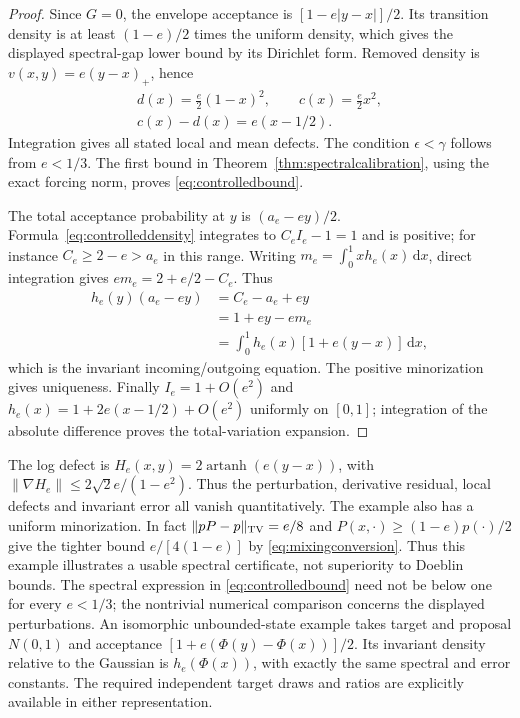 \documentclass[pdflatex,iicol,sn-mathphys-ay]{sn-jnl}
\theoremstyle{definition}\newtheorem{definition}[theorem]{Definition}
\theoremstyle{remark}\newtheorem{remark}[theorem]{Remark}
\numberwithin{equation}{section}
\newcommand{\dd}{\,\mathrm d}\newcommand{\cA}{c_\alpha}\newcommand{\sg}{\operatorname{sigmoid}}
\newcommand{\1}{\mathbf 1}
\begin{document}
\begin{proof}
Since $G=0$, the envelope acceptance is $[1-e|y-x|]/2$. Its transition density is at least $(1-e)/2$ times the uniform density, which gives the displayed spectral-gap lower bound by its Dirichlet form. Removed density is $v(x,y)=e(y-x)_+$, hence
\[
\begin{gathered}
 d(x)=\frac e2(1-x)^2,\qquad c(x)=\frac e2x^2,\\
 c(x)-d(x)=e(x-1/2).
\end{gathered}
\]
Integration gives all stated local and mean defects. The condition $\epsilon<\gamma$ follows from $e<1/3$. The first bound in Theorem~\ref{thm:spectralcalibration}, using the exact forcing norm, proves \eqref{eq:controlledbound}.

The total acceptance probability at $y$ is $(a_e-ey)/2$. Formula~\eqref{eq:controlleddensity} integrates to $C_e I_e-1=1$ and is positive; for instance $C_e\ge2-e>a_e$ in this range. Writing $m_e=\int_0^1 xh_e(x)\dd x$, direct integration gives $em_e=2+e/2-C_e$. Thus
\[
\begin{aligned}
 h_e(y)(a_e-ey)&=C_e-a_e+ey\\
 &=1+ey-em_e\\
 &=\int_0^1 h_e(x)[1+e(y-x)]\dd x,
\end{aligned}
\]
which is the invariant incoming/outgoing equation. The positive minorization gives uniqueness. Finally $I_e=1+O(e^2)$ and
$h_e(x)=1+2e(x-1/2)+O(e^2)$ uniformly on $[0,1]$; integration of the absolute difference proves the total-variation expansion.
\end{proof}

The log defect is $H_e(x,y)=2\operatorname{artanh}(e(y-x))$, with
$\|\nabla H_e\|\le2\sqrt2e/(1-e^2)$. Thus the perturbation, derivative residual, local defects and invariant error all vanish quantitatively. The example also has a uniform minorization. In fact $\|pP-p\|_{\mathrm{TV}}=e/8$ and $P(x,\cdot)\ge(1-e)p(\cdot)/2$ give the tighter bound $e/[4(1-e)]$ by \eqref{eq:mixingconversion}. Thus this example illustrates a usable spectral certificate, not superiority to Doeblin bounds. The spectral expression in \eqref{eq:controlledbound} need not be below one for every $e<1/3$; the nontrivial numerical comparison concerns the displayed perturbations. An isomorphic unbounded-state example takes target and proposal $N(0,1)$ and acceptance $[1+e(\Phi(y)-\Phi(x))]/2$. Its invariant density relative to the Gaussian is $h_e(\Phi(x))$, with exactly the same spectral and error constants. The required independent target draws and ratios are explicitly available in either representation.
\end{document}
